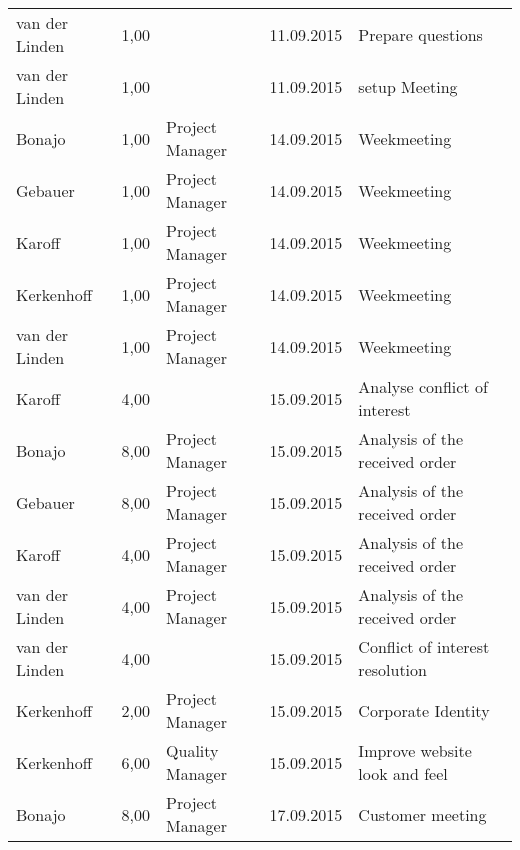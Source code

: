 \begin{longtable}{ l r p{2cm} c p{4cm} }
		van der Linden          & 1,00           &                 & 11.09.2015    & Prepare questions                            \\
		van der Linden          & 1,00           &                 & 11.09.2015    & setup Meeting                                \\
		Bonajo                  & 1,00           & Project Manager & 14.09.2015    & Weekmeeting                                  \\
		Gebauer                 & 1,00           & Project Manager & 14.09.2015    & Weekmeeting                                  \\
		Karoff                  & 1,00           & Project Manager & 14.09.2015    & Weekmeeting                                  \\
		Kerkenhoff              & 1,00           & Project Manager & 14.09.2015    & Weekmeeting                                  \\
		van der Linden          & 1,00           & Project Manager & 14.09.2015    & Weekmeeting                                  \\
		Karoff                  & 4,00           &                 & 15.09.2015    & Analyse conflict of interest                 \\
		Bonajo                  & 8,00           & Project Manager & 15.09.2015    & Analysis of the received order               \\
		Gebauer                 & 8,00           & Project Manager & 15.09.2015    & Analysis of the received order               \\
		Karoff                  & 4,00           & Project Manager & 15.09.2015    & Analysis of the received order               \\
		van der Linden          & 4,00           & Project Manager & 15.09.2015    & Analysis of the received order               \\
		van der Linden          & 4,00           &                 & 15.09.2015    & Conflict of interest resolution              \\
		Kerkenhoff              & 2,00           & Project Manager & 15.09.2015    & Corporate Identity                           \\
		Kerkenhoff              & 6,00           & Quality Manager & 15.09.2015    & Improve website look and feel                \\
		Bonajo                  & 8,00           & Project Manager & 17.09.2015    & Customer meeting                              \\

\end{longtable}
